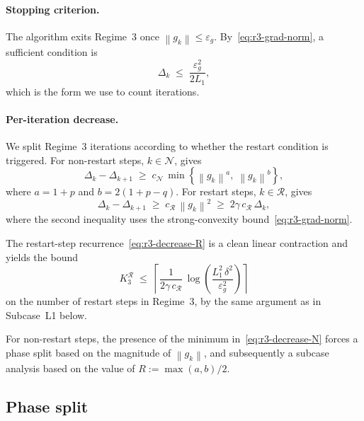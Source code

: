 \documentclass[11pt,a4paper]{article}
\theoremstyle{plain}
\theoremstyle{definition}
\newcommand{\norm}[1]{\left\|#1\right\|}
\newcommand{\eps}{\varepsilon}
\newcommand{\epsg}{\eps_{g}}
\newcommand{\Lone}{L_{1}}
\newcommand{\setN}{\mathcal{N}}
\newcommand{\setR}{\mathcal{R}}
\newcommand{\cN}{c_{\setN}}
\begin{document}
\paragraph{Stopping criterion.}
The algorithm exits Regime~3 once $\norm{g_{k}} \leq \epsg$. By~\eqref{eq:r3-grad-norm}, a sufficient condition is
\begin{equation}\label{eq:r3-stop}
\Delta_{k} \;\leq\; \frac{\epsg^{2}}{2\Lone},
\end{equation}
which is the form we use to count iterations.

\paragraph{Per-iteration decrease.}
We split Regime~3 iterations according to whether the restart condition is triggered. For non-restart steps, $k \in \setN$,  gives
\begin{equation}\label{eq:r3-decrease-N}
\Delta_{k} - \Delta_{k+1} \;\geq\; \cN \,\min\!\left\{ \norm{g_{k}}^{a},\; \norm{g_{k}}^{b} \right\},
\end{equation}
where $a = 1+p$ and $b = 2(1+p-q)$. For restart steps, $k \in \setR$,  gives
\begin{equation}\label{eq:r3-decrease-R}
\Delta_{k} - \Delta_{k+1} \;\geq\; c_{\setR}\,\norm{g_{k}}^{2} \;\geq\; 2\gamma\,c_{\setR}\,\Delta_{k},
\end{equation}
where the second inequality uses the strong-convexity bound~\eqref{eq:r3-grad-norm}.

The restart-step recurrence~\eqref{eq:r3-decrease-R} is a clean linear contraction and yields the bound
\begin{equation}\label{eq:r3-restart-bound}
K_{3}^{\setR} \;\leq\; \left\lceil \frac{1}{2\gamma\,c_{\setR}}\,\log\!\left(\frac{\Lone^{2}\,\delta^{2}}{\epsg^{2}}\right) \right\rceil
\end{equation}
on the number of restart steps in Regime~3, by the same argument as in Subcase~L1 below.

For non-restart steps, the presence of the minimum in~\eqref{eq:r3-decrease-N} forces a phase split based on the magnitude of $\norm{g_{k}}$, and subsequently 
a subcase analysis based on the value of $R := \max(a,b)/2$.
\subsection{Phase split}\label{subsec:r3-phase}
\end{document}
